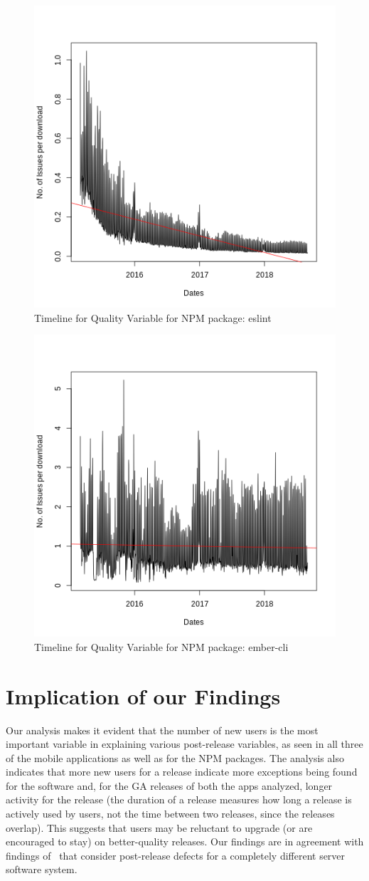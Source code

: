 \documentclass[smallextended]{svjour3}       %
\begin{document}
\begin{figure}[!t]
\centering
\includegraphics[width=0.5\linewidth]{eslint}
\caption{Timeline for Quality Variable for NPM package: eslint}
\label{fig:tNe}
\end{figure}

\begin{figure}[!t]
\centering
\includegraphics[width=0.5\linewidth]{ember-cli}
\caption{Timeline for Quality Variable for NPM package: ember-cli}
\label{fig:tNe}
\end{figure}


\section{Implication of our Findings}\label{s:implication}

Our analysis makes it evident that the number of new
users  is the most important variable in explaining various post-release variables, as seen in all three of the mobile applications as well as for the NPM packages. 
The analysis also indicates that more new users for a release indicate 
more exceptions being found for the software
and, for the GA releases of both the apps analyzed, longer activity for the release (the duration
of a release measures how long a release is actively used by users,
not the time between two releases, since the releases overlap).  This
suggests that users  may 
 be reluctant to upgrade (or are encouraged to stay) on better-quality releases.
 Our findings are in agreement with findings
of~\cite{IQ08,hmps15,mockus2005predictors} that consider 
post-release defects for a completely different server software system.
\end{document}
